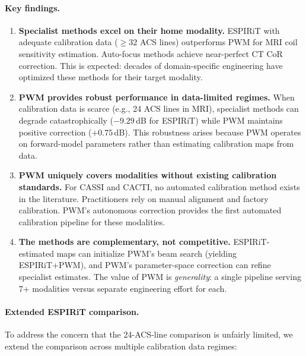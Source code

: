 \documentclass[11pt]{article}
\theoremstyle{definition}
\begin{document}
\paragraph{Key findings.}
\begin{enumerate}
  \item \textbf{Specialist methods excel on their home modality.} ESPIRiT with adequate calibration data ($\geq 32$ ACS lines) outperforms PWM for MRI coil sensitivity estimation. Auto-focus methods achieve near-perfect CT CoR correction. This is expected: decades of domain-specific engineering have optimized these methods for their target modality.

  \item \textbf{PWM provides robust performance in data-limited regimes.} When calibration data is scarce (e.g., 24 ACS lines in MRI), specialist methods can degrade catastrophically ($-9.29$\,dB for ESPIRiT) while PWM maintains positive correction ($+0.75$\,dB). This robustness arises because PWM operates on forward-model parameters rather than estimating calibration maps from data.

  \item \textbf{PWM uniquely covers modalities without existing calibration standards.} For CASSI and CACTI, no automated calibration method exists in the literature. Practitioners rely on manual alignment and factory calibration. PWM's autonomous correction provides the first automated calibration pipeline for these modalities.

  \item \textbf{The methods are complementary, not competitive.} ESPIRiT-estimated maps can initialize PWM's beam search (yielding ESPIRiT+PWM), and PWM's parameter-space correction can refine specialist estimates. The value of PWM is \emph{generality}: a single pipeline serving 7+ modalities versus separate engineering effort for each.
\end{enumerate}

\paragraph{Extended ESPIRiT comparison.}
To address the concern that the 24-ACS-line comparison is unfairly limited, we extend the comparison across multiple calibration data regimes:
\end{document}

